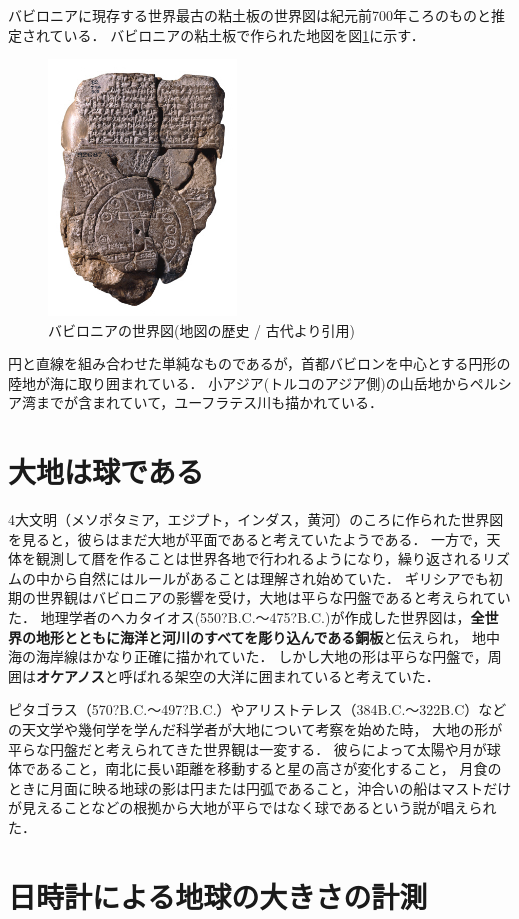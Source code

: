 \documentclass[titlepage]{jarticle}
\begin{document}
バビロニアに現存する世界最古の粘土板の世界図は紀元前700年ころのものと推定されている．
バビロニアの粘土板で作られた地図を図\ref{map}に示す．
\begin{figure}[H]
      \centering
      \includegraphics[width=5cm]{img/babironia.jpg}
      \caption{バビロニアの世界図(地図の歴史 / 古代より引用)}
      \label{map}
\end{figure}
円と直線を組み合わせた単純なものであるが，首都バビロンを中心とする円形の陸地が海に取り囲まれている．
小アジア(トルコのアジア側)の山岳地からペルシア湾までが含まれていて，ユーフラテス川も描かれている．
\section{大地は球である}
4大文明（メソポタミア，エジプト，インダス，黄河）のころに作られた世界図を見ると，彼らはまだ大地が平面であると考えていたようである．
一方で，天体を観測して暦を作ることは世界各地で行われるようになり，繰り返されるリズムの中から自然にはルールがあることは理解され始めていた．
ギリシアでも初期の世界観はバビロニアの影響を受け，大地は平らな円盤であると考えられていた．
地理学者のへカタイオス(550?B.C.～475?B.C.)が作成した世界図は，\textbf{全世界の地形とともに海洋と河川のすべてを彫り込んである銅板}と伝えられ，
地中海の海岸線はかなり正確に描かれていた．
しかし大地の形は平らな円盤で，周囲は\textbf{オケアノス}と呼ばれる架空の大洋に囲まれていると考えていた．

ピタゴラス（570?B.C.～497?B.C.）やアリストテレス（384B.C.～322B.C）などの天文学や幾何学を学んだ科学者が大地について考察を始めた時，
大地の形が平らな円盤だと考えられてきた世界観は一変する．
彼らによって太陽や月が球体であること，南北に長い距離を移動すると星の高さが変化すること，
月食のときに月面に映る地球の影は円または円弧であること，沖合いの船はマストだけが見えることなどの根拠から大地が平らではなく球であるという説が唱えられた．
\section{日時計による地球の大きさの計測}
\end{document}
